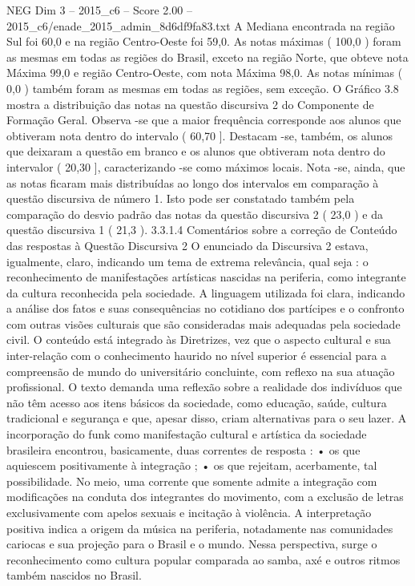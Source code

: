 \begin{textsample}{NEG Dim 3 – 2015\_c6 – Score 2.00 – 2015\_c6/enade\_2015\_admin\_8d6df9fa83.txt}
A Mediana encontrada na região Sul foi 60,0 e na região Centro-Oeste foi 59,0.
As notas máximas ( 100,0 ) foram as mesmas em todas as regiões do Brasil, exceto na região Norte, que obteve nota Máxima 99,0 e região Centro-Oeste, com nota Máxima 98,0.
As notas mínimas ( 0,0 ) também foram as mesmas em todas as regiões, sem exceção.
O Gráfico 3.8 mostra a distribuição das notas na questão discursiva 2 do Componente de Formação Geral.
Observa -se que a maior frequência corresponde aos alunos que obtiveram nota dentro do intervalo ( 60,70 ].
Destacam -se, também, os alunos que deixaram a questão em branco e os alunos que obtiveram nota dentro do intervalor ( 20,30 ], caracterizando -se como máximos locais.
Nota -se, ainda, que as notas ficaram mais distribuídas ao longo dos intervalos em comparação à questão discursiva de número 1.
Isto pode ser constatado também pela comparação do desvio padrão das notas da questão discursiva 2 ( 23,0 ) e da questão discursiva 1 ( 21,3 ). 3.3.1.4 Comentários sobre a correção de Conteúdo das respostas à Questão Discursiva 2 O enunciado da Discursiva 2 estava, igualmente, claro, indicando um tema de extrema relevância, qual seja : o reconhecimento de manifestações artísticas nascidas na periferia, como integrante da cultura reconhecida pela sociedade.
A linguagem utilizada foi clara, indicando a análise dos fatos e suas consequências no cotidiano dos partícipes e o confronto com outras visões culturais que são consideradas mais adequadas pela sociedade civil.
O conteúdo está integrado às Diretrizes, vez que o aspecto cultural e sua inter-relação com o conhecimento haurido no nível superior é essencial para a compreensão de mundo do universitário concluinte, com reflexo na sua atuação profissional.
O texto demanda uma reflexão sobre a realidade dos indivíduos que não têm acesso aos itens básicos da sociedade, como educação, saúde, cultura tradicional e segurança e que, apesar disso, criam alternativas para o seu lazer.
A incorporação do funk como manifestação cultural e artística da sociedade brasileira encontrou, basicamente, duas correntes de resposta : • os que aquiescem positivamente à integração ; • os que rejeitam, acerbamente, tal possibilidade.
No meio, uma corrente que somente admite a integração com modificações na conduta dos integrantes do movimento, com a exclusão de letras exclusivamente com apelos sexuais e incitação à violência.
A interpretação positiva indica a origem da música na periferia, notadamente nas comunidades cariocas e sua projeção para o Brasil e o mundo.
Nessa perspectiva, surge o reconhecimento como cultura popular comparada ao samba, axé e outros ritmos também nascidos no Brasil.

\end{textsample}
